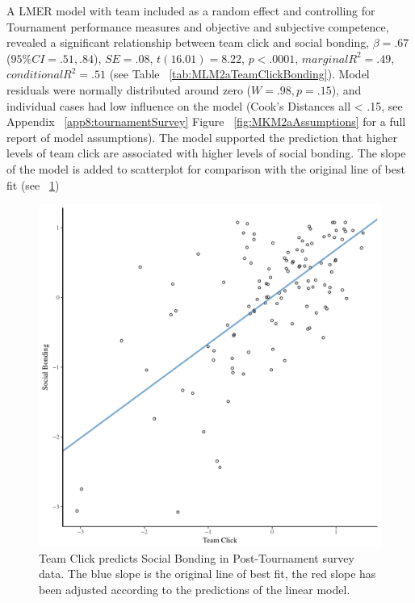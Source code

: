 \begin{CJK}{UTF8}{gbsn}
 A LMER model with team included as a random effect and controlling for Tournament performance measures and objective and subjective competence, revealed a significant relationship between team click and social bonding, $\beta = .67$ ($95\% CI =  .51, .84$), $SE = .08$, $t(16.01) = 8.22$, $p < .0001$, $marginal R^2 = .49$, $conditional R^2 = .51$ (see Table ~\ref{tab:MLM2aTeamClickBonding}).  Model residuals were normally distributed around zero ($W = .98, p = .15$), and individual cases had low influence on the model (Cook's Distances all < .15, see Appendix ~\ref{app8:tournamentSurvey} Figure ~\ref{fig:MKM2aAssumptions} for a full report of model assumptions).  The model supported the prediction that higher levels of team click are associated with higher levels of social bonding.
 The slope of the model is added to scatterplot for comparison with the original line of best fit (see ~\ref{fig:clickBondModelSlope})

  

  \begin{figure}[htbp]
    \centering
  \includegraphics[scale=.5]{images/clickBondModelSlope.pdf}
    \caption{Team Click predicts Social Bonding in Post-Tournament survey data. The blue slope is the original line of best fit, the red slope has been adjusted according to the predictions of the linear model.}
    \label{fig:clickBondModelSlope}
  \end{figure}




\end{CJK}
